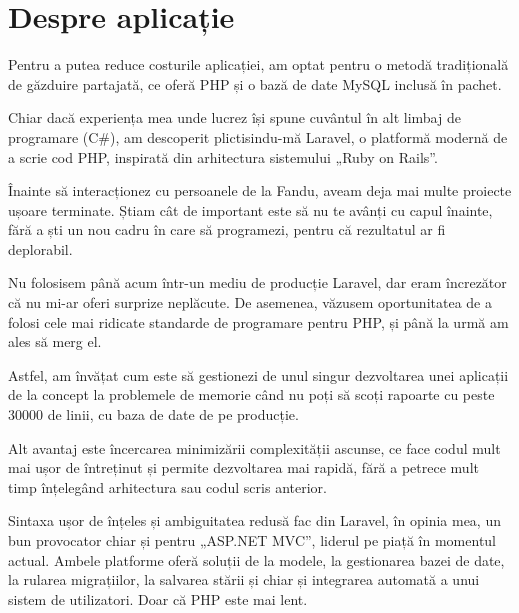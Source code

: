 \section{Despre aplicație}
	Pentru a putea reduce costurile aplicației, am optat pentru o metodă tradițională de găzduire partajată, ce oferă PHP și o bază de date MySQL inclusă în pachet.

	Chiar dacă experiența mea unde lucrez își spune cuvântul în alt limbaj de programare (C\#), am descoperit plictisindu-mă Laravel\cite{laravel}, o platformă modernă de a scrie cod PHP, inspirată din arhitectura sistemului „Ruby on Rails”.

	Înainte să interacționez cu persoanele de la Fandu, aveam deja mai multe proiecte ușoare terminate.
	Știam cât de important este să nu te avânți cu capul înainte, fără a ști un nou cadru în care să programezi, pentru că rezultatul ar fi deplorabil.

	Nu folosisem până acum într-un mediu de producție Laravel, dar eram încrezător că nu mi-ar oferi surprize neplăcute.
	De asemenea, văzusem oportunitatea de a folosi cele mai ridicate standarde de programare pentru PHP, și până la urmă am ales să merg el.

	Astfel, am învățat cum este să gestionezi de unul singur dezvoltarea unei aplicații de la concept la problemele de memorie când nu poți să scoți rapoarte cu peste 30000 de linii, cu baza de date de pe producție.

	Alt avantaj este încercarea minimizării complexității ascunse\cite{laravel_complexity}, ce face codul mult mai ușor de întreținut și permite dezvoltarea mai rapidă, fără a petrece mult timp înțelegând arhitectura sau codul scris anterior.

	Sintaxa ușor de înțeles și ambiguitatea redusă fac din Laravel, în opinia mea, un bun provocator chiar și pentru „ASP.NET MVC”\cite{hotframeworks}, liderul pe piață în momentul actual.
	Ambele platforme oferă soluții de la modele, la gestionarea bazei de date, la rularea migrațiilor, la salvarea stării și chiar și integrarea automată a unui sistem de utilizatori.
	Doar că PHP este mai lent.
